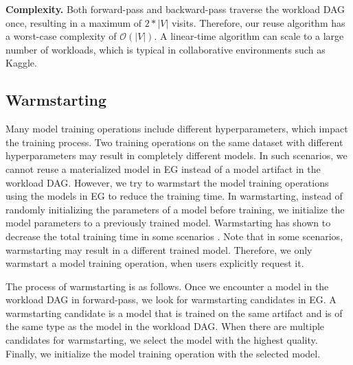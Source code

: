 \textbf{Complexity.}
Both forward-pass and backward-pass traverse the workload DAG once, resulting in a maximum of $2*|V|$ visits.
Therefore, our reuse algorithm has a worst-case complexity of $\mathcal{O}(|V|)$.
A linear-time algorithm can scale to a large number of workloads, which is typical in collaborative environments such as Kaggle. 

\subsection{Warmstarting}
Many model training operations include different hyperparameters, which impact the training process.
Two training operations on the same dataset with different hyperparameters may result in completely different models.
In such scenarios, we cannot reuse a materialized model in EG instead of a model artifact in the workload DAG.
However, we try to warmstart the model training operations using the models in EG to reduce the training time.
In warmstarting, instead of randomly initializing the parameters of a model before training, we initialize the model parameters to a previously trained model.
Warmstarting has shown to decrease the total training time in some scenarios \cite{baylor2017tfx}.
Note that in some scenarios, warmstarting may result in a different trained model.
Therefore, we only warmstart a model training operation, when users explicitly request it.

The process of warmstarting is as follows.
Once we encounter a model in the workload DAG in forward-pass, we look for warmstarting candidates in EG.
A warmstarting candidate is a model that is trained on the same artifact and is of the same type as the model in the workload DAG.
When there are multiple candidates for warmstarting, we select the model with the highest quality.
Finally, we initialize the model training operation with the selected model.